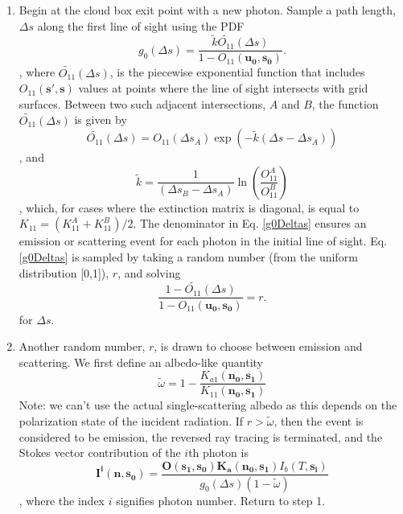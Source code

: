 \begin{enumerate}
\item
Begin at the cloud box exit point with a new photon. Sample a
  path length, $\Delta s$ along the first line of sight using the PDF
\begin{equation}
g_0(\Delta s)=\frac{\tilde{k}\tilde{O_{11}}(\Delta s)}
{1-O_{11}(\mathbf{u_0,s_0})}.
\label{g0Deltas}
\end{equation}
, where $\tilde{O_{11}}(\Delta s)$, is the piecewise exponential
function that includes $O_{11}(\mathbf{s',s})$ values at points
where the line of sight intersects with grid surfaces.
Between two such adjacent intersections, $A$ and $B$, the function
$\tilde{O_{11}}(\Delta s)$ is given by
\begin{equation}
\tilde{O_{11}}(\Delta s)=O_{11}(\Delta s_A)\exp\left(-\tilde{k}\left(\Delta s-\Delta
s_A\right)\right)
\label{O11}
\end{equation}
, and
\begin{equation}
\tilde{k}=\frac{1}{\left(\Delta s_B-\Delta s_A\right)}
\ln\left(\frac{O_{11}^A}{O_{11}^B}\right)
\end{equation}
, which, for cases where the extinction matrix is diagonal, is equal to $K_{11}=(K_{11}^A+K_{11}^B)/2$.
The denominator in Eq. \ref{g0Deltas} ensures an emission or scattering
event for each photon in the initial line of sight.
Eq. \ref{g0Deltas} is sampled by taking a random number (from the
uniform distribution [0,1]), $r$, and solving 
\begin{equation}
\frac{1-\tilde{O_{11}}(\Delta s)}{1-O_{11}(\mathbf{u_0,s_0})}=r.
\label{solvefor0}
\end{equation}
for $\Delta s$.
\item
Another random number, $r$, is drawn to choose between emission and scattering.  We first define an albedo-like quantity
\begin{equation}
\tilde{\omega}=1-\frac{K_{a1}(\mathbf{n_{0},s_{1}})}{K_{11}(\mathbf{n_{0},s_{1}})}
\end{equation}
Note: we can't use the actual single-scattering albedo as this depends
on the polarization state of the incident radiation.  If $r>\tilde{\omega}$, then the event is considered to be emission,
the reversed ray tracing is terminated, and the Stokes vector
contribution of the $i$th photon is
\begin{equation}
\mathbf{I^i(n,s_0)}=\frac{\mathbf{O(s_1,s_0)}\mathbf{K_a(n_0,s_1)}
  I_b(T,\mathbf{s_i})}{g_0(\Delta s) \left(1-\tilde{\omega}\right)}
\label{Iemission2}
\end{equation}
, where the index $i$ signifies photon number. Return to step 1.


\end{enumerate}

